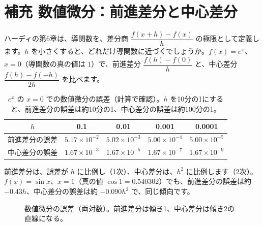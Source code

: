 \documentclass[a4paper,11pt,openany]{ltjsbook}
\begin{document}
\section{補充 数値微分：前進差分と中心差分}

ハーディの第6章は、導関数を、差分商 $\dfrac{f(x+h)-f(x)}h$ の極限として定義します。$h$ を小さくすると、どれだけ導関数に近づくでしょうか。$f(x)=e^x$、$x=0$（導関数の真の値は $1$）で、前進差分 $\dfrac{f(h)-f(0)}h$ と、中心差分 $\dfrac{f(h)-f(-h)}{2h}$ を比べます。

\begin{table}[htbp]
\centering
\begin{tabular}{c|cccc}
\toprule
$h$ & 0.1 & 0.01 & 0.001 & 0.0001\\
\midrule
前進差分の誤差 & $5.17\times10^{-2}$ & $5.02\times10^{-3}$ & $5.00\times10^{-4}$ & $5.00\times10^{-5}$\\
中心差分の誤差 & $1.67\times10^{-3}$ & $1.67\times10^{-5}$ & $1.67\times10^{-7}$ & $1.67\times10^{-9}$\\
\bottomrule
\end{tabular}
\caption{$e^x$ の $x=0$ での数値微分の誤差（計算で確認）。$h$ を10分の1にすると、前進差分の誤差は約10分の1、中心差分の誤差は約100分の1。}
\end{table}

前進差分は、誤差が $h$ に比例し（1次）、中心差分は、$h^2$ に比例します（2次）。$f(x)=\sin x$、$x=1$（真の値 $\cos1=0.540302$）でも、前進差分の誤差は約 $-0.43h$、中心差分の誤差は約 $-0.090h^2$ で、同じ傾向です。

\begin{figure}[htbp]
\centering
{}
\caption{数値微分の誤差（両対数）。前進差分は傾き1、中心差分は傾き2の直線になる。}
\end{figure}
\end{document}
